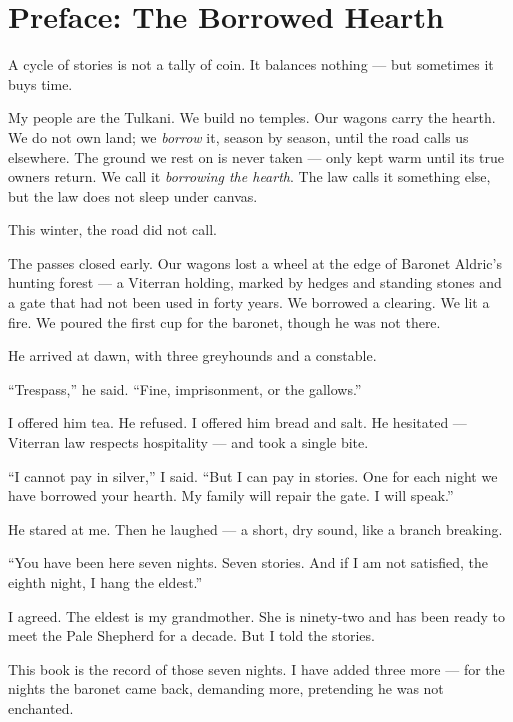 \documentclass[10pt,twoside]{book}
\begin{document}




\tableofcontents

\chapter*{Preface: The Borrowed Hearth}

A cycle of stories is not a tally of coin. It balances nothing --- but sometimes it buys time.

My people are the Tulkani. We build no temples. Our wagons carry the hearth. We do not own land; we \textit{borrow} it, season by season, until the road calls us elsewhere. The ground we rest on is never taken --- only kept warm until its true owners return. We call it \textit{borrowing the hearth}. The law calls it something else, but the law does not sleep under canvas.

This winter, the road did not call.

The passes closed early. Our wagons lost a wheel at the edge of Baronet Aldric's hunting forest --- a Viterran holding, marked by hedges and standing stones and a gate that had not been used in forty years. We borrowed a clearing. We lit a fire. We poured the first cup for the baronet, though he was not there.

He arrived at dawn, with three greyhounds and a constable.

``Trespass,'' he said. ``Fine, imprisonment, or the gallows.''

I offered him tea. He refused. I offered him bread and salt. He hesitated --- Viterran law respects hospitality --- and took a single bite.

``I cannot pay in silver,'' I said. ``But I can pay in stories. One for each night we have borrowed your hearth. My family will repair the gate. I will speak.''

He stared at me. Then he laughed --- a short, dry sound, like a branch breaking.

``You have been here seven nights. Seven stories. And if I am not satisfied, the eighth night, I hang the eldest.''

I agreed. The eldest is my grandmother. She is ninety-two and has been ready to meet the Pale Shepherd for a decade. But I told the stories.

This book is the record of those seven nights. I have added three more --- for the nights the baronet came back, demanding more, pretending he was not enchanted.
\end{document}
